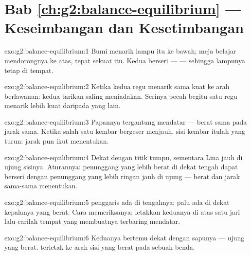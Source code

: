 \section*{Bab \ref{ch:g2:balance-equilibrium} --- Keseimbangan dan Kesetimbangan}

\begin{solution}{exo:g2:balance-equilibrium:1}
Bumi menarik lampu itu ke bawah; meja belajar mendorongnya ke atas,
tepat sekuat itu. Kedua  berseri ---  --- sehingga
lampunya tetap di tempat.
\end{solution}

\begin{solution}{exo:g2:balance-equilibrium:2}
Ketika kedua regu menarik sama kuat ke arah berlawanan: kedua tarikan
saling meniadakan. Serinya pecah begitu satu regu menarik lebih kuat
daripada yang lain.
\end{solution}

\begin{solution}{exo:g2:balance-equilibrium:3}
Papannya tergantung mendatar --- berat sama pada jarak sama. Ketika
salah satu kembar bergeser menjauh, sisi kembar itulah yang turun:
jarak pun ikut menentukan.
\end{solution}

\begin{solution}{exo:g2:balance-equilibrium:4}
Dekat dengan titik tumpu, sementara Lina jauh di ujung sisinya.
Aturannya: penunggang yang lebih berat di dekat tengah dapat berseri
dengan penunggang yang lebih ringan jauh di ujung --- berat dan jarak
sama-sama menentukan.
\end{solution}

\begin{solution}{exo:g2:balance-equilibrium:5}
 penggaris ada di tengahnya;  palu ada di
dekat kepalanya yang berat. Cara memeriksanya: letakkan keduanya di
atas satu jari lalu carilah tempat yang membuatnya terbaring mendatar.
\end{solution}

\begin{solution}{exo:g2:balance-equilibrium:6}
Keduanya bertemu dekat dengan sapunya --- ujung yang berat.  terletak ke arah sisi yang berat pada sebuah benda.
\end{solution}

